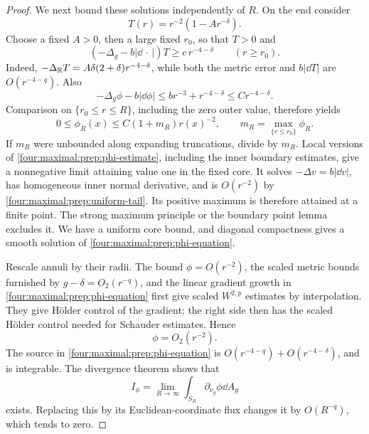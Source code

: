 \begin{proof}
We next bound these solutions independently of \(R\).  On the end
consider
\[
 T(r)=r^{-2}(1-Ar^{-\delta}).
\]
Choose a fixed \(A>0\), then a large fixed \(r_0\), so that \(T>0\)
and
\begin{equation}
 (-\Delta_g-b|\dd\,\cdot\,|)T
 \ge c\,r^{-4-\delta}\qquad(r\ge r_0).
\label{four:maximal:prep:radial-barrier}
\end{equation}
Indeed,
\(-\Delta_\mathbb R T=A\delta(2+\delta)r^{-4-\delta}\), while both
the metric error and \(b|\dd T|\) are \(O(r^{-4-q})\).
Also
\[
 -\Delta_g\phi-b|\dd\phi|
 \le b r^{-3}+r^{-4-\delta}\le C r^{-4-\delta}.
\]
Comparison on \(\{r_0\le r\le R\}\), including the zero outer
value, therefore yields
\begin{equation}
 0\le\phi_R(x)\le C(1+m_R)r(x)^{-2},
 \qquad m_R=\max_{\{r\le r_0\}}\phi_R.
\label{four:maximal:prep:uniform-tail}
\end{equation}
If \(m_R\) were unbounded along expanding truncations, divide by
\(m_R\).  Local versions of \eqref{four:maximal:prep:phi-estimate}, including
the inner boundary estimates, give a nonnegative limit attaining
value one in the fixed core.  It solves
\(-\Delta v=b|\dd v|\), has homogeneous inner normal derivative,
and is \(O(r^{-2})\) by \eqref{four:maximal:prep:uniform-tail}.  Its positive
maximum is therefore attained at a finite point.  The strong maximum
principle or the boundary point lemma excludes it.  We have a uniform
core bound, and diagonal compactness gives a smooth solution of
\eqref{four:maximal:prep:phi-equation}.

Rescale annuli by their radii.  The bound \(\phi=O(r^{-2})\),
the scaled metric bounds furnished by \(g-\delta=O_2(r^{-q})\),
and the linear gradient growth in \eqref{four:maximal:prep:phi-equation} first
give scaled \(W^{2,p}\) estimates by interpolation.  They give
H\"older control of the gradient; the right side then has the
scaled H\"older control needed for Schauder estimates.  Hence
\begin{equation}
 \phi=O_2(r^{-2}).
\label{four:maximal:prep:phi-decay}
\end{equation}
The source in \eqref{four:maximal:prep:phi-equation} is
\(O(r^{-4-q})+O(r^{-4-\delta})\), and is integrable.  The
divergence theorem shows that
\[
 I_\phi=\lim_{R\to\infty}\int_{S_R}\partial_{\nu_g}\phi\dd A_g
\]
exists.  Replacing this by its Euclidean-coordinate flux changes it
by \(O(R^{-q})\), which tends to zero.


\end{proof}
